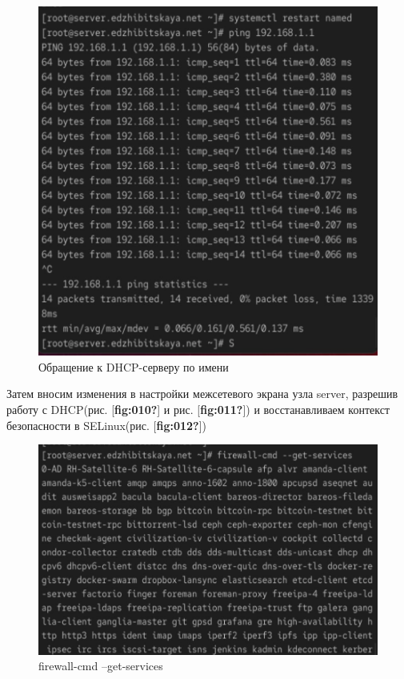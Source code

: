 \documentclass[
  english,
  russian,
  12pt,
  a4paper,
  DIV=11,
  numbers=noendperiod]{scrreprt}
\begin{document}
\begin{figure}

{\centering \includegraphics[width=0.7\linewidth,height=\textheight,keepaspectratio]{image/9.jpg}

}

\caption{Обращение к DHCP-серверу по имени}

\end{figure}%

Затем вносим изменения в настройки межсетевого экрана узла server,
разрешив работу с DHCP(рис. {[}\textbf{fig:010?}{]} и рис.
{[}\textbf{fig:011?}{]}) и восстанавливаем контекст безопасности в
SELinux(рис. {[}\textbf{fig:012?}{]})

\begin{figure}

{\centering \includegraphics[width=0.7\linewidth,height=\textheight,keepaspectratio]{image/10.jpg}

}

\caption{firewall-cmd --get-services}

\end{figure}%
\end{document}
